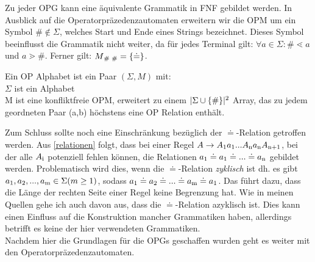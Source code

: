 Zu jeder OPG kann eine äquivalente Grammatik in FNF gebildet werden. \cite{og}
In Ausblick auf die Operatorpräzedenzautomaten erweitern wir die OPM um ein Symbol $\# \notin \Sigma$, welches Start und Ende eines Strings bezeichnet. Dieses Symbol beeinflusst die Grammatik nicht weiter, da für jedes Terminal gilt: $\forall a \in \Sigma: \# \lessdot a $ und $a \gtrdot \#$. Ferner gilt: $M\textsubscript{\# \#}=\{ \doteq \}$.
\begin{definition}
Ein OP Alphabet ist ein Paar $(\Sigma, M)$ mit:\\
$\Sigma$ ist ein Alphabet \\
M ist eine konfliktfreie OPM, erweitert zu einem $ |\Sigma \cup \{\#\}|\textsuperscript{2}$ Array, das zu jedem geordneten Paar (a,b) höchstens eine OP Relation enthält.
\end{definition} 
Zum Schluss sollte noch eine Einschränkung bezüglich der $\doteq$-Relation getroffen werden. Aus \ref{relationen} folgt, dass bei einer Regel $A \rightarrow  A \textsubscript{1} a \textsubscript{1}... A \textsubscript{n} a \textsubscript{n} A \textsubscript{n+1}$, bei der alle $A \textsubscript{i}$ potenziell fehlen können, die Relationen $a\textsubscript{1} \doteq a \textsubscript{1} \doteq ... \doteq a \textsubscript{n}$ gebildet werden. Problematisch wird dies, wenn die $\doteq$-Relation \textit{zyklisch} ist dh. es gibt $a\textsubscript{1}, a\textsubscript{2}, ..., a \textsubscript{m} \in \Sigma (m \geq  1)$, sodass $a\textsubscript{1} \doteq a \textsubscript{2} \doteq ... \doteq a \textsubscript{m} \doteq a \textsubscript{1}$. Das führt dazu, dass die Länge der rechten Seite einer Regel keine Begrenzung hat. Wie in meinen Quellen gehe ich auch davon aus, dass die $\doteq$-Relation azyklisch ist. Dies kann einen Einfluss auf die Konstruktion mancher Grammatiken haben, allerdings betrifft es keine der hier verwendeten Grammatiken.\\
Nachdem hier die Grundlagen für die OPGs geschaffen wurden geht es weiter mit den Operatorpräzedenzautomaten.

